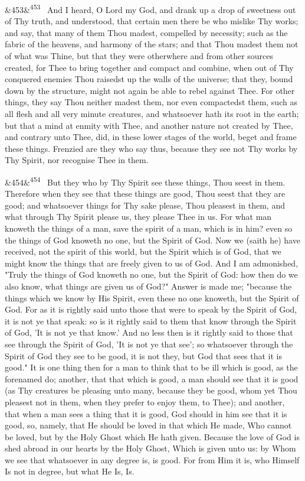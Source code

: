 \documentclass[12pt]{article}
\newcommand{\para}[1][]{\par\noindent\ifx&#1&\else\textsuperscript{\footnotesize #1}~\fi}
\begin{document}
\para[453] And I heard, O Lord my God, and drank up a drop of sweetness out of Thy truth, and understood, that certain men there be who mislike Thy works; and say, that many of them Thou madest, compelled by necessity; such as the fabric of the heavens, and harmony of the stars; and that Thou madest them not of what was Thine, but that they were otherwhere and from other sources created, for Thee to bring together and compact and combine, when out of Thy conquered enemies Thou raisedst up the walls of the universe; that they, bound down by the structure, might not again be able to rebel against Thee. For other things, they say Thou neither madest them, nor even compactedst them, such as all flesh and all very minute creatures, and whatsoever hath its root in the earth; but that a mind at enmity with Thee, and another nature not created by Thee, and contrary unto Thee, did, in these lower stages of the world, beget and frame these things. Frenzied are they who say thus, because they see not Thy works by Thy Spirit, nor recognise Thee in them.

\para[454] But they who by Thy Spirit see these things, Thou seest in them. Therefore when they see that these things are good, Thou seest that they are good; and whatsoever things for Thy sake please, Thou pleasest in them, and what through Thy Spirit please us, they please Thee in us. For what man knoweth the things of a man, save the spirit of a man, which is in him? even so the things of God knoweth no one, but the Spirit of God. Now we (saith he) have received, not the spirit of this world, but the Spirit which is of God, that we might know the things that are freely given to us of God. And I am admonished, "Truly the things of God knoweth no one, but the Spirit of God: how then do we also know, what things are given us of God?" Answer is made me; "because the things which we know by His Spirit, even these no one knoweth, but the Spirit of God. For as it is rightly said unto those that were to speak by the Spirit of God, it is not ye that speak: so is it rightly said to them that know through the Spirit of God, 'It is not ye that know.' And no less then is it rightly said to those that see through the Spirit of God, 'It is not ye that see'; so whatsoever through the Spirit of God they see to be good, it is not they, but God that sees that it is good." It is one thing then for a man to think that to be ill which is good, as the forenamed do; another, that that which is good, a man should see that it is good (as Thy creatures be pleasing unto many, because they be good, whom yet Thou pleasest not in them, when they prefer to enjoy them, to Thee); and another, that when a man sees a thing that it is good, God should in him see that it is good, so, namely, that He should be loved in that which He made, Who cannot be loved, but by the Holy Ghost which He hath given. Because the love of God is shed abroad in our hearts by the Holy Ghost, Which is given unto us: by Whom we see that whatsoever in any degree is, is good. For from Him it is, who Himself Is not in degree, but what He Is, Is.
\end{document}
